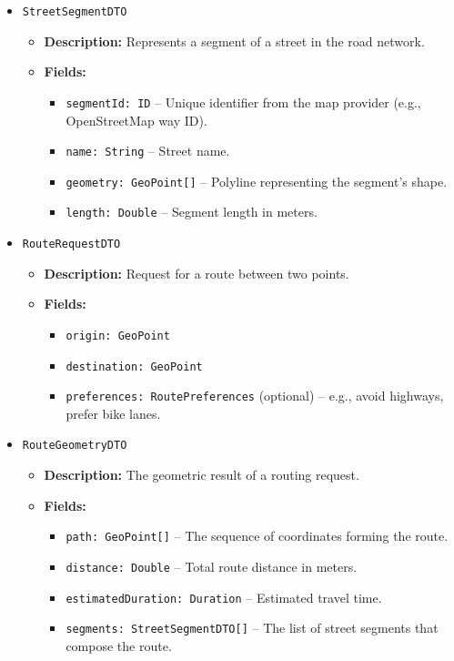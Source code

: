\begin{itemize}
    \item \texttt{StreetSegmentDTO}
    \begin{itemize}
        \item \textbf{Description:} Represents a segment of a street in the road network.
        \item \textbf{Fields:}
        \begin{itemize}
            \item \texttt{segmentId: ID} – Unique identifier from the map provider (e.g., OpenStreetMap way ID).
            \item \texttt{name: String} – Street name.
            \item \texttt{geometry: GeoPoint[]} – Polyline representing the segment's shape.
            \item \texttt{length: Double} – Segment length in meters.
        \end{itemize}
    \end{itemize}

    \item \texttt{RouteRequestDTO}
    \begin{itemize}
        \item \textbf{Description:} Request for a route between two points.
        \item \textbf{Fields:}
        \begin{itemize}
            \item \texttt{origin: GeoPoint}
            \item \texttt{destination: GeoPoint}
            \item \texttt{preferences: RoutePreferences} (optional) – e.g., avoid highways, prefer bike lanes.
        \end{itemize}
    \end{itemize}

    \item \texttt{RouteGeometryDTO}
    \begin{itemize}
        \item \textbf{Description:} The geometric result of a routing request.
        \item \textbf{Fields:}
        \begin{itemize}
            \item \texttt{path: GeoPoint[]} – The sequence of coordinates forming the route.
            \item \texttt{distance: Double} – Total route distance in meters.
            \item \texttt{estimatedDuration: Duration} – Estimated travel time.
            \item \texttt{segments: StreetSegmentDTO[]} – The list of street segments that compose the route.
        \end{itemize}
    \end{itemize}
\end{itemize}

